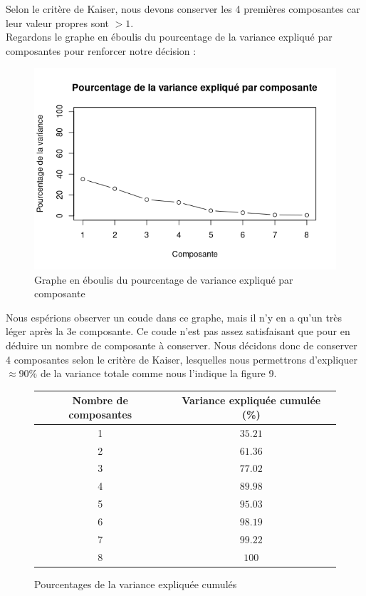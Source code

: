 \documentclass[11pt]{article}
\begin{document}
\noindent Selon le critère de Kaiser, nous devons conserver les 4 premières composantes car leur valeur propres sont $>1$.\\
Regardons le graphe en éboulis du pourcentage de la variance expliqué par composantes pour renforcer notre décision :
\begin{figure}[H]
\centering
\includegraphics[scale=1]{coude.png}
\caption{Graphe en éboulis du pourcentage de variance expliqué par composante}
\end{figure}
\noindent Nous espérions observer un coude dans ce graphe, mais il n'y en a qu'un très léger après la 3e composante. Ce coude n'est pas assez satisfaisant que pour en déduire un nombre de composante à conserver. Nous décidons donc de conserver 4 composantes selon le critère de Kaiser, lesquelles nous permettrons d'expliquer $\approx 90\%$ de la variance totale comme nous l'indique la figure 9.
\begin{figure}[H]
\centering
\begin{tabular}{|c|c|}
\hline
Nombre de composantes & Variance expliquée cumulée (\%)\\
\hline
1&$35.21$\\
2&$61.36$\\
3&$77.02$\\
4&$89.98$\\
5&$95.03$\\
6&$98.19$\\
7&$99.22$\\
8&$100$\\
\hline
\end{tabular}
\caption{Pourcentages de la variance expliquée cumulés}
\end{figure}
\end{document}
